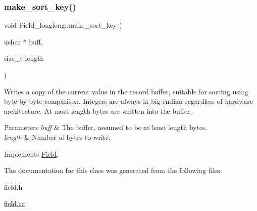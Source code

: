 \subsubsection{\texorpdfstring{make\+\_\+sort\+\_\+key()}{make\_sort\_key()}}
{\footnotesize\ttfamily void Field\+\_\+longlong\+::make\+\_\+sort\+\_\+key (\begin{DoxyParamCaption}\item[{uchar $\ast$}]{buff,  }\item[{size\+\_\+t}]{length }\end{DoxyParamCaption})\hspace{0.3cm}{\ttfamily [virtual]}}

Writes a copy of the current value in the record buffer, suitable for sorting using byte-\/by-\/byte comparison. Integers are always in big-\/endian regardless of hardware architecture. At most length bytes are written into the buffer.


\begin{DoxyParams}{Parameters}
{\em buff} & The buffer, assumed to be at least length bytes.\\
\hline
{\em length} & Number of bytes to write. \\
\hline
\end{DoxyParams}


Implements \mbox{\hyperlink{classField_af3bc27d237b6ae6ef3dc7a2aec3d79ac}{Field}}.



The documentation for this class was generated from the following files\+:\begin{DoxyCompactItemize}
\item 
field.\+h\item 
\mbox{\hyperlink{field_8cc}{field.\+cc}}\end{DoxyCompactItemize}
